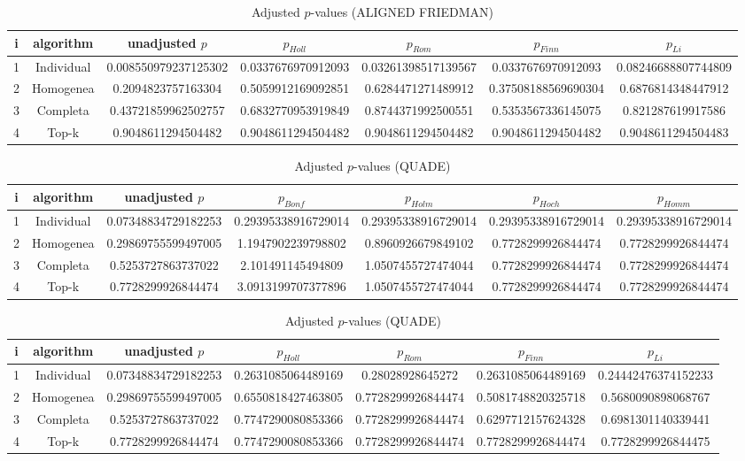 \documentclass[a4paper,10pt]{article}
\begin{document}
\begin{landscape}
\begin{table}[!htp]
\centering\scriptsize
\caption{Adjusted $p$-values (ALIGNED FRIEDMAN)}
\begin{tabular}{ccccccc}
i&algorithm&unadjusted $p$&$p_{Holl}$&$p_{Rom}$&$p_{Finn}$&$p_{Li}$\\
\hline
1&Individual&0.008550979237125302&0.0337676970912093&0.03261398517139567&0.0337676970912093&0.08246688807744809\\
2&Homogenea&0.2094823757163304&0.5059912169092851&0.6284471271489912&0.37508188569690304&0.6876814348447912\\
3&Completa&0.43721859962502757&0.6832770953919849&0.8744371992500551&0.5353567336145075&0.821287619917586\\
4&Top-k&0.9048611294504482&0.9048611294504482&0.9048611294504482&0.9048611294504482&0.9048611294504483\\
\hline
\end{tabular}
\end{table}


\newpage

\begin{table}[!htp]
\centering\scriptsize
\caption{Adjusted $p$-values (QUADE)}
\begin{tabular}{ccccccc}
i&algorithm&unadjusted $p$&$p_{Bonf}$&$p_{Holm}$&$p_{Hoch}$&$p_{Homm}$\\
\hline
1&Individual&0.07348834729182253&0.29395338916729014&0.29395338916729014&0.29395338916729014&0.29395338916729014\\
2&Homogenea&0.29869755599497005&1.1947902239798802&0.8960926679849102&0.7728299926844474&0.7728299926844474\\
3&Completa&0.5253727863737022&2.101491145494809&1.0507455727474044&0.7728299926844474&0.7728299926844474\\
4&Top-k&0.7728299926844474&3.0913199707377896&1.0507455727474044&0.7728299926844474&0.7728299926844474\\
\hline
\end{tabular}
\end{table}

\begin{table}[!htp]
\centering\scriptsize
\caption{Adjusted $p$-values (QUADE)}
\begin{tabular}{ccccccc}
i&algorithm&unadjusted $p$&$p_{Holl}$&$p_{Rom}$&$p_{Finn}$&$p_{Li}$\\
\hline
1&Individual&0.07348834729182253&0.2631085064489169&0.28028928645272&0.2631085064489169&0.24442476374152233\\
2&Homogenea&0.29869755599497005&0.6550818427463805&0.7728299926844474&0.5081748820325718&0.5680090898068767\\
3&Completa&0.5253727863737022&0.7747290080853366&0.7728299926844474&0.6297712157624328&0.6981301140339441\\
4&Top-k&0.7728299926844474&0.7747290080853366&0.7728299926844474&0.7728299926844474&0.7728299926844475\\
\hline
\end{tabular}
\end{table}

\end{landscape}
\end{document}
